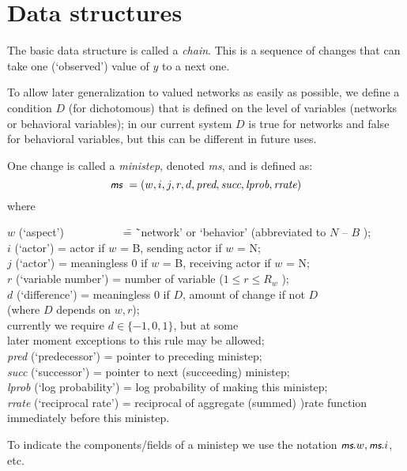\documentclass[a4paper,fleqn,12pt]{article}
\newcommand{\nnm}[1]{\textsf{\small\textit{#1}}}
\newcommand{\ms}{\textsl{\textsf{\small ms}}} %
\begin{document}
\section{Data structures}


The basic data structure is called a \emph{chain}.
This is a sequence of changes that can take one (`observed') value
of $y$ to a next one.

To allow later generalization to valued networks as easily as possible,
we define a condition $D$ (for dichotomous) that is defined on the
level of variables (networks or behavioral variables);
in our current system $D$ is true for networks and false for
behavioral variables, but this can be different in future uses.

One change is called a \nnm{ministep}, denoted \ms, and is defined as:
\begin{equation}
    \ms \ = (w,i,j,r,d,\textit{pred},\textit{succ},
                    \textit{lprob}, \textit{rrate})    \label{ministep}
\end{equation}
where
\begin{tabbing}
$w$ (`aspect') $\phantom{abcdefghij}$ \= = \= `network' or `behavior' (abbreviated to $N$ -- $B$ );\\
$i$ (`actor') \> = \> actor if $w$ = B, sending actor if $w$ = N;\\
$j$ (`actor') \> = \> meaningless 0 if $w$ = B, receiving actor if $w$ = N;\\
$r$ (`variable number') \> = \> number of variable ($1 \leq r \leq R_w$ );\\
$d$ (`difference') \> = \> meaningless 0 if $D$, amount of change if not $D$\\
   \> \>   (where $D $ depends on $w, r$);\\
   \> \>    currently we require $d \in \{-1, 0, 1\}$, but at some \\
   \> \>    later moment exceptions to this rule may be allowed;\\
\textit{pred} (`predecessor') \> = \> pointer to preceding ministep;\\
\textit{succ} (`successor') \> = \> pointer to next (succeeding) ministep;\\
\textit{lprob} (`log probability') \> = \> log probability of making this ministep;\\
\textit{rrate} (`reciprocal rate') \> = \> reciprocal of aggregate (summed) )rate function \\
   \> \>      immediately before this ministep.
\end{tabbing}
To indicate the components/fields of a ministep we use the notation
$\ms.w, \ms.i$, etc.
\end{document}

